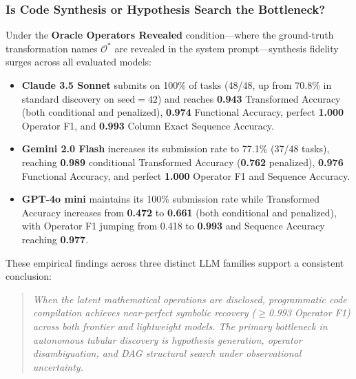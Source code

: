 \documentclass[sigconf]{acmart}
\begin{document}
\subsubsection{Is Code Synthesis or Hypothesis Search the Bottleneck?}
Under the \textbf{Oracle Operators Revealed} condition—where the ground-truth transformation names $\mathcal{O}^*$ are revealed in the system prompt—synthesis fidelity surges across all evaluated models:
\begin{itemize}
    \item \textbf{Claude 3.5 Sonnet} submits on 100\% of tasks (48/48, up from 70.8\% in standard discovery on $\text{seed}=42$) and reaches \textbf{0.943} Transformed Accuracy (both conditional and penalized), \textbf{0.974} Functional Accuracy, perfect \textbf{1.000} Operator F1, and \textbf{0.993} Column Exact Sequence Accuracy.
    \item \textbf{Gemini 2.0 Flash} increases its submission rate to 77.1\% (37/48 tasks), reaching \textbf{0.989} conditional Transformed Accuracy (\textbf{0.762} penalized), \textbf{0.976} Functional Accuracy, and perfect \textbf{1.000} Operator F1 and Sequence Accuracy.
    \item \textbf{GPT-4o mini} maintains its 100\% submission rate while Transformed Accuracy increases from \textbf{0.472} to \textbf{0.661} (both conditional and penalized), with Operator F1 jumping from 0.418 to \textbf{0.993} and Sequence Accuracy reaching \textbf{0.977}.
\end{itemize}
These empirical findings across three distinct LLM families support a consistent conclusion:
\begin{quote}
\emph{When the latent mathematical operations are disclosed, programmatic code compilation achieves near-perfect symbolic recovery ($\ge$0.993 Operator F1) across both frontier and lightweight models. The primary bottleneck in autonomous tabular discovery is hypothesis generation, operator disambiguation, and DAG structural search under observational uncertainty.}
\end{quote}
\end{document}
